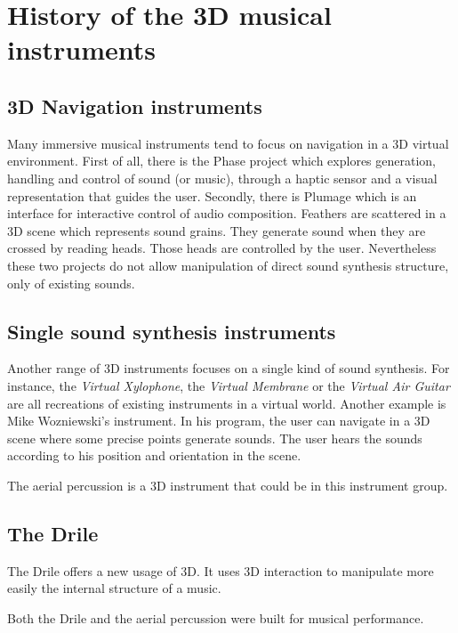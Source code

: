 \section{History of the 3D musical instruments}
\subsection{3D Navigation instruments}
Many immersive musical instruments tend to focus on navigation in a 3D virtual environment.
First of all, there is the Phase project  \cite{rodet2005study} which explores generation, handling and control of sound (or music), through a haptic sensor and a visual representation that guides the user.
Secondly, there is Plumage \cite{plumage2007} which is an interface for interactive control of  audio composition. Feathers are scattered in a 3D scene which represents sound grains. They generate sound when they are crossed by reading heads. Those heads are controlled by the user.
Nevertheless these two projects do not allow manipulation of direct sound synthesis structure, only of existing sounds. 

\subsection{Single sound synthesis instruments}
Another range of 3D instruments focuses on a single kind of sound synthesis. For instance, the \textit{Virtual Xylophone}, the \textit{Virtual Membrane} or the \textit{Virtual Air Guitar} \cite{maki2005} are all recreations of existing instruments in a virtual world. 
Another example is Mike Wozniewski's instrument. In his program, the user can navigate in a 3D scene where some precise points generate sounds\cite{wozniewski2006spatial}. The user hears the sounds according to his position and orientation in the scene.

The aerial percussion is a 3D instrument that could be in this instrument group.

\subsection{The Drile}
The Drile offers a new usage of 3D. It uses 3D interaction to manipulate more easily the internal structure of a music.

Both the Drile and the aerial percussion were built for musical performance.
